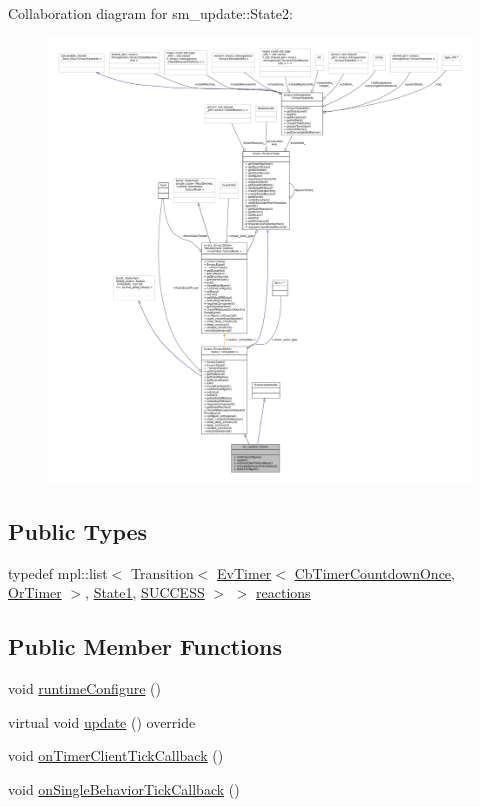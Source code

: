Collaboration diagram for sm\+\_\+update\+:\+:State2\+:
\nopagebreak
\begin{figure}[H]
\begin{center}
\leavevmode
\includegraphics[width=350pt]{structsm__update_1_1State2__coll__graph}
\end{center}
\end{figure}
\subsection*{Public Types}
\begin{DoxyCompactItemize}
\item 
typedef mpl\+::list$<$ Transition$<$ \hyperlink{structros__timer__client_1_1EvTimer}{Ev\+Timer}$<$ \hyperlink{classros__timer__client_1_1CbTimerCountdownOnce}{Cb\+Timer\+Countdown\+Once}, \hyperlink{classsm__update_1_1OrTimer}{Or\+Timer} $>$, \hyperlink{structsm__update_1_1State1}{State1}, \hyperlink{structsmacc_1_1default__transition__tags_1_1SUCCESS}{S\+U\+C\+C\+E\+SS} $>$ $>$ \hyperlink{structsm__update_1_1State2_a6030dbce2602c3a49aae0a372e46e4df}{reactions}
\end{DoxyCompactItemize}
\subsection*{Public Member Functions}
\begin{DoxyCompactItemize}
\item 
void \hyperlink{structsm__update_1_1State2_a4b85c8a77894cc78f017da0de9e2bfa3}{runtime\+Configure} ()
\item 
virtual void \hyperlink{structsm__update_1_1State2_a395d9f5e248d78da06c0c375dd8cb1b6}{update} () override
\item 
void \hyperlink{structsm__update_1_1State2_a217fac4964c4905921e215805f8b80be}{on\+Timer\+Client\+Tick\+Callback} ()
\item 
void \hyperlink{structsm__update_1_1State2_a652c5a4944bcff8dcb237937b340b7dd}{on\+Single\+Behavior\+Tick\+Callback} ()
\end{DoxyCompactItemize}
